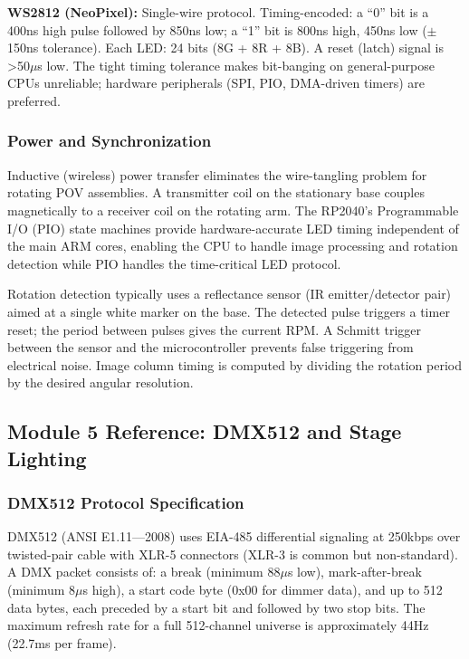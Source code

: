 \documentclass[11pt,letterpaper]{article}
\begin{document}
\textbf{WS2812 (NeoPixel):} Single-wire protocol. Timing-encoded: a ``0'' bit is a 400ns high pulse followed by 850ns low; a ``1'' bit is 800ns high, 450ns low ($\pm$150ns tolerance). Each LED: 24 bits (8G + 8R + 8B). A reset (latch) signal is >50$\mu$s low. The tight timing tolerance makes bit-banging on general-purpose CPUs unreliable; hardware peripherals (SPI, PIO, DMA-driven timers) are preferred.

\subsubsection{Power and Synchronization}

Inductive (wireless) power transfer eliminates the wire-tangling problem for rotating POV assemblies. A transmitter coil on the stationary base couples magnetically to a receiver coil on the rotating arm. The RP2040's Programmable I/O (PIO) state machines provide hardware-accurate LED timing independent of the main ARM cores, enabling the CPU to handle image processing and rotation detection while PIO handles the time-critical LED protocol.

Rotation detection typically uses a reflectance sensor (IR emitter/detector pair) aimed at a single white marker on the base. The detected pulse triggers a timer reset; the period between pulses gives the current RPM. A Schmitt trigger between the sensor and the microcontroller prevents false triggering from electrical noise. Image column timing is computed by dividing the rotation period by the desired angular resolution.

\subsection{Module 5 Reference: DMX512 and Stage Lighting}

\subsubsection{DMX512 Protocol Specification}

DMX512 (ANSI E1.11---2008) uses EIA-485 differential signaling at 250kbps over twisted-pair cable with XLR-5 connectors (XLR-3 is common but non-standard). A DMX packet consists of: a break (minimum 88$\mu$s low), mark-after-break (minimum 8$\mu$s high), a start code byte (0x00 for dimmer data), and up to 512 data bytes, each preceded by a start bit and followed by two stop bits. The maximum refresh rate for a full 512-channel universe is approximately 44Hz (22.7ms per frame).
\end{document}
